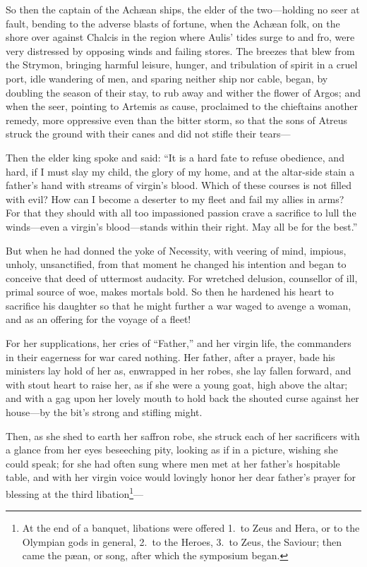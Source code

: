 \documentclass[12pt]{article}
\begin{document}
So then the captain of the Ach{\ae}an ships, the elder of the two---holding no seer at fault, bending to the adverse blasts of fortune, when the Ach{\ae}an folk, on the shore over against Chalcis in the region where Aulis' tides surge to and fro, were very distressed by opposing winds and failing stores. The breezes that blew from the Strymon, bringing harmful leisure, hunger, and tribulation of spirit in a cruel port, idle wandering of men, and sparing neither ship nor cable, began, by doubling the season of their stay, to rub away and wither the flower of Argos; and when the seer, pointing to Artemis as cause, proclaimed to the chieftains another remedy, more oppressive even than the bitter storm, so that the sons of Atreus struck the ground with their canes and did not stifle their tears---

Then the elder king spoke and said: ``It is a hard fate to refuse obedience, and hard, if I must slay my child, the glory of my home, and at the altar-side stain a father's hand with streams of virgin's blood. Which of these courses is not filled with evil? How can I become a deserter to my fleet and fail my allies in arms? For that they should with all too impassioned passion crave a sacrifice to lull the winds---even a virgin's blood---stands within their right. May all be for the best.''

But when he had donned the yoke of Necessity, with veering of mind, impious, unholy, unsanctified, from that moment he changed his intention and began to conceive that deed of uttermost audacity. For wretched delusion, counsellor of ill, primal source of woe, makes mortals bold. So then he hardened his heart to sacrifice his daughter so that he might further a war waged to avenge a woman, and as an offering for the voyage of a fleet!

For her supplications, her cries of ``Father,'' and her virgin life, the commanders in their eagerness for war cared nothing. Her father, after a prayer, bade his ministers lay hold of her as, enwrapped in her robes, she lay fallen forward, and with stout heart to raise her, as if she were a young goat, high above the altar; and with a gag upon her lovely mouth to hold back the shouted curse against her house---by the bit's strong and stifling might.

Then, as she shed to earth her saffron robe, she struck each of her sacrificers with a glance from her eyes beseeching pity, looking as if in a picture, wishing she could speak; for she had often sung where men met at her father's hospitable table, and with her virgin voice would lovingly honor her dear father's prayer for blessing at the third libation\footnote{At the end of a banquet, libations were offered 1.~to Zeus and Hera, or to the Olympian gods in general, 2.~to the Heroes, 3.~to Zeus, the Saviour; then came the p{\ae}an, or song, after which the symposium began.}---
\end{document}

